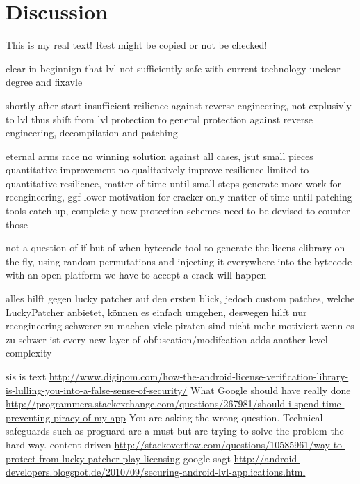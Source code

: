 \section{Discussion}\label{section:conclusion-discussion}
This is my real text! Rest might be copied or not be checked!

%
clear in beginnign that lvl not sufficiently safe with current technology
unclear degree and fixavle

shortly after start insufficient reilience against reverse engineering, not explusivly to lvl
thus shift from lvl protection to general protection against reverse engineering, decompilation and patching

eternal arms race
no winning solution against all cases, jsut small pieces quantitative improvement
no qualitatively improve resilience
limited to quantitative resilience, matter of time until small steps
generate more work for reengineering, ggf lower motivation for cracker
only matter of time until patching tools catch up, completely new protection schemes need to be devised to counter those
\cite{munteanLicense}
%

%
not a question of if but of when
bytecode tool to generate the licens elibrary on the fly, using random  permutations and injecting it everywhere into the bytecode
with an open platform we have to accept a crack will happen
\cite{digipomLvl}
%

alles hilft gegen lucky patcher auf den ersten blick, jedoch custom patches, welche LuckyPatcher anbietet\cite{munteanLicense}, können es einfach umgehen,
deswegen hilft nur reengineering schwerer zu machen
viele piraten sind nicht mehr motiviert wenn es zu schwer ist\newline
every new layer of obfuscation/modifcation adds another level complexity\newline

sis is text
\url{http://www.digipom.com/how-the-android-license-verification-library-is-lulling-you-into-a-false-sense-of-security/} What Google should have really done
\newline
\url{http://programmers.stackexchange.com/questions/267981/should-i-spend-time-preventing-piracy-of-my-app} You are asking the wrong question. Technical safeguards such as proguard are a must but are trying to solve the problem the hard way.\newline
content driven \url{http://stackoverflow.com/questions/10585961/way-to-protect-from-lucky-patcher-play-licensing}\newline
google sagt \url{http://android-developers.blogspot.de/2010/09/securing-android-lvl-applications.html}\newline

